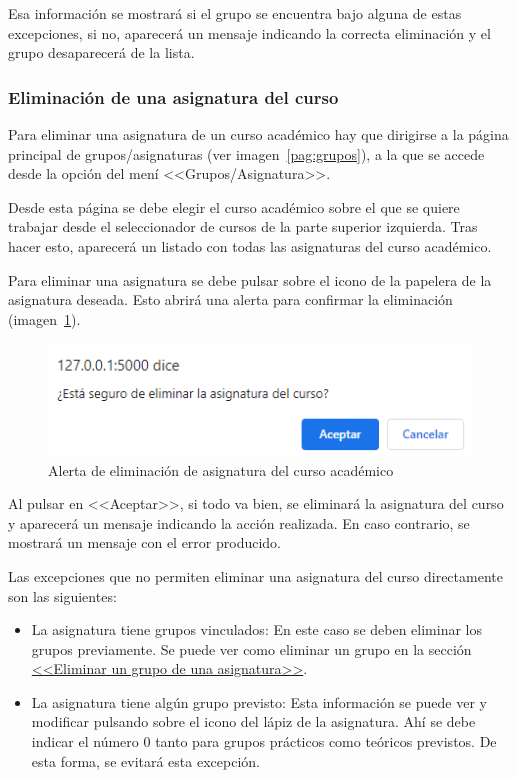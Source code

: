 Esa información se mostrará si el grupo se encuentra bajo alguna de estas excepciones, si no, aparecerá un mensaje indicando la correcta eliminación y el grupo desaparecerá de la lista.

\subsubsection{Eliminación de una asignatura del curso}\label{section:eliminarAsigCurso}
Para eliminar una asignatura de un curso académico hay que dirigirse a la página principal de grupos/asignaturas (ver imagen~\ref{pag:grupos}), a la que se accede desde la opción del mení <<Grupos/Asignatura>>.

Desde esta página se debe elegir el curso académico sobre el que se quiere trabajar desde el seleccionador de cursos de la parte superior izquierda.
Tras hacer esto, aparecerá un listado con todas las asignaturas del curso académico.

Para eliminar una asignatura se debe pulsar sobre el icono de la papelera de la asignatura deseada.
Esto abrirá una alerta para confirmar la eliminación (imagen~\ref{pag:alertElAsigCurso}).

\begin{figure}
	\centering
	\includegraphics[width=.7\textwidth]{../img/Anexos/Manual usuario/alertElAsigCurso.png}
	\caption{Alerta de eliminación de asignatura del curso académico}\label{pag:alertElAsigCurso}
\end{figure}

Al pulsar en <<Aceptar>>, si todo va bien, se eliminará la asignatura del curso y aparecerá un mensaje indicando la acción realizada.
En caso contrario, se mostrará un mensaje con el error producido.

Las excepciones que no permiten eliminar una asignatura del curso directamente son las siguientes:
\begin{itemize}
\item La asignatura tiene grupos vinculados:
En este caso se deben eliminar los grupos previamente. 
Se puede ver como eliminar un grupo en la sección \hyperref[section:eliminarGrupo]{<<Eliminar un grupo de una asignatura>>}.
\item La asignatura tiene algún grupo previsto:
Esta información se puede ver y modificar pulsando sobre el icono del lápiz de la asignatura.
Ahí se debe indicar el número 0 tanto para grupos prácticos como teóricos previstos.
De esta forma, se evitará esta excepción.
\end{itemize}

